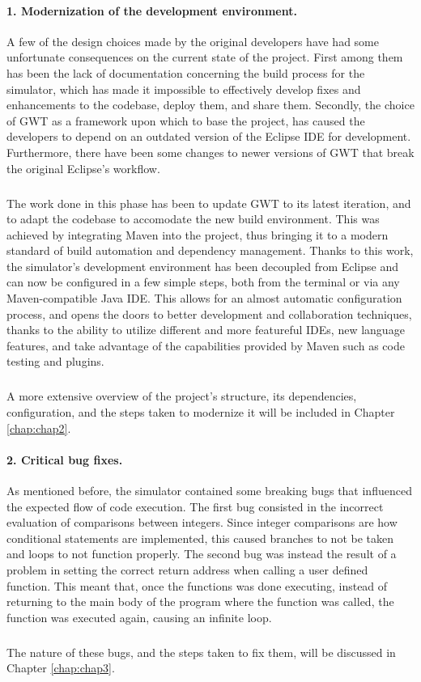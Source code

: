 \paragraph{1. Modernization of the development environment.}
A few of the design choices made by the original developers have had some unfortunate consequences on the current state of the project. First among them has been the lack of documentation concerning the build process for the simulator, which has made it impossible to effectively develop fixes and enhancements to the codebase, deploy them, and share them. Secondly, the choice of GWT as a framework upon which to base the project, has caused the developers to depend on an outdated version of the Eclipse IDE for development. Furthermore, there have been some changes to newer versions of GWT that break the original Eclipse's workflow.
\subparagraph{}
The work done in this phase has been to update GWT to its latest iteration, and to adapt the codebase to accomodate the new build environment. This was achieved by integrating Maven \cite{mavenweb} into the project, thus bringing it to a modern standard of build automation and dependency management. Thanks to this work, the simulator's development environment has been decoupled from Eclipse and can now be configured in a few simple steps, both from the terminal or via any Maven-compatible Java IDE. This allows for an almost automatic configuration process, and opens the doors to better development and collaboration techniques, thanks to the ability to utilize different and more featureful IDEs, new language features, and take advantage of the capabilities provided by Maven such as code testing and plugins.
\subparagraph{}
A more extensive overview of the project's structure, its dependencies, configuration, and the steps taken to modernize it will be included in Chapter \ref{chap:chap2}.

\paragraph{2. Critical bug fixes.}
As mentioned before, the simulator contained some breaking bugs that influenced the expected flow of code execution.
The first bug consisted in the incorrect evaluation of comparisons between integers. Since integer comparisons are how conditional statements are implemented, this caused branches to not be taken and loops to not function properly.
The second bug was instead the result of a problem in setting the correct return address when calling a user defined function. This meant that, once the functions was done executing, instead of returning to the main body of the program where the function was called, the function was executed again, causing an infinite loop.
\subparagraph{}
The nature of these bugs, and the steps taken to fix them, will be discussed in Chapter \ref{chap:chap3}.


